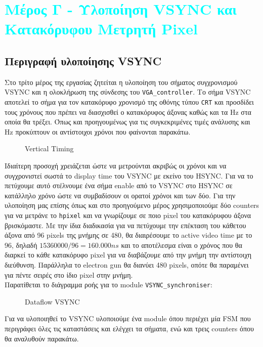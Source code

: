 \documentclass[12pt,a4paper]{article}
\begin{document}
	\section{\textcolor{cyan}{Μέρος Γ - Υλοποίηση VSYNC και Κατακόρυφου Μετρητή Pixel} }
	\subsection{Περιγραφή υλοποίησης VSYNC}
	Στο τρίτο μέρος της εργασίας ζητείται η υλοποίηση του σήματος συγχρονισμού VSYNC και η ολοκλήρωση της σύνδεσης του \verb*|VGA_controller|. Το σήμα VSYNC αποτελεί το σήμα για τον κατακόρυφο χρονισμό της οθόνης τύπου \verb*|CRT| και προσδίδει τους χρόνους που πρέπει να διασχισθεί ο κατακόρυφος άξονας καθώς και τα Hz στα οποία θα τρέξει. Όπως και προηγουμένως για τις συγκεκριμένες τιμές ανάλυσης και Hz προκύπτουν οι αντίστοιχοι χρόνοι που φαίνονται παρακάτω.
	\begin{figure} [htbp]
		\caption{Vertical Timing}
		\label{Vertical Timing}
	\end{figure}
	
	Ιδιαίτερη προσοχή χρειάζεται ώστε να μετρούνται ακριβώς οι χρόνοι και να συγχρονιστεί σωστά το display time του VSYNC με εκείνο του HSYNC. Για να το πετύχουμε αυτό στέλνουμε ένα σήμα enable από το VSYNC στο HSYNC σε κατάλληλο χρόνο ώστε να συμβαδίσουν οι ορατοί χρόνοι και των δύο. Για την υλοποίηση μας επίσης όπως και στο προηγούμενο μέρος χρησιμοποιούμε δύο counters για να μετράνε το \verb*|hpixel| και να γνωρίζουμε σε ποιο pixel του κατακόρυφου άξονα βρισκόμαστε. Με την ίδια διαδικασία για να πετύχουμε την επέκταση του κάθετου άξονα από 96 pixels της μνήμης σε 480, θα διαιρέσουμε το active video time με το 96, δηλαδή $15360000 / 96 = 160.000ns$ και το αποτέλεσμα είναι ο χρόνος που θα διαρκεί το κάθε κατακόρυφο pixel για να διαβάζουμε από την μνήμη την αντίστοιχη διεύθυνση. Παράλληλα το electron gun θα διανύει 480 pixels, οπότε θα παραμένει για πέντε σειρές στο ίδιο pixel στην μνήμη.\\
	Παρατίθεται το διάγραμμα ροής για το module \verb*|VSYNC_synchroniser|:
	\begin{figure} [H]
		\caption{Dataflow VSYNC}
		\label{Dataflow VSYNC}
	\end{figure}
	Για να υλοποιηθεί το VSYNC υλοποιούμε ένα module όπου περιέχει μία FSM που περιγράφει όλες τις καταστάσεις και ελέγχει τα σήματα, ενώ και τρεις counters όπου θα αναλυθούν παρακάτω. 
\end{document}
